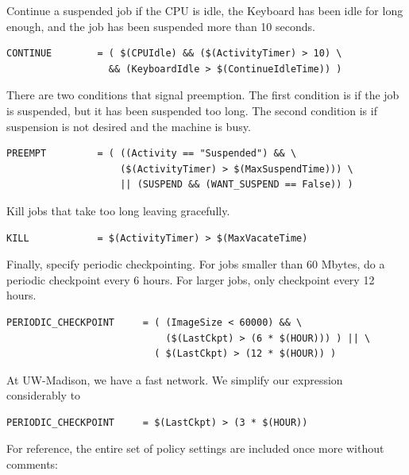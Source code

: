 Continue a suspended job if the CPU is idle, the Keyboard has been
idle for long enough, and the job has been suspended more
than 10 seconds.
\begin{verbatim}
CONTINUE        = ( $(CPUIdle) && ($(ActivityTimer) > 10) \
                  && (KeyboardIdle > $(ContinueIdleTime)) )
\end{verbatim}

There are two conditions that signal preemption.
The first condition is if the job is suspended,
but it has been suspended too long.
The second condition is if suspension is not desired and the machine is busy. 
\begin{verbatim}
PREEMPT	        = ( ((Activity == "Suspended") && \
                    ($(ActivityTimer) > $(MaxSuspendTime))) \
                    || (SUSPEND && (WANT_SUSPEND == False)) )
\end{verbatim}

Kill jobs that take too long leaving gracefully.
\begin{verbatim}
KILL            = $(ActivityTimer) > $(MaxVacateTime)
\end{verbatim}

Finally, specify periodic checkpointing.  
For jobs smaller than 60 Mbytes, do a periodic checkpoint every 6 hours.  
For larger jobs, only checkpoint every 12 hours.
\begin{verbatim}
PERIODIC_CHECKPOINT     = ( (ImageSize < 60000) && \
                            ($(LastCkpt) > (6 * $(HOUR))) ) || \ 
                          ( $(LastCkpt) > (12 * $(HOUR)) )
\end{verbatim}

\index{policy!at UW-Madison}

At UW-Madison, we have a fast network.
We simplify our expression considerably to
\begin{verbatim}
PERIODIC_CHECKPOINT     = $(LastCkpt) > (3 * $(HOUR))
\end{verbatim}

For reference, the entire set of policy settings are included
once more without comments:


